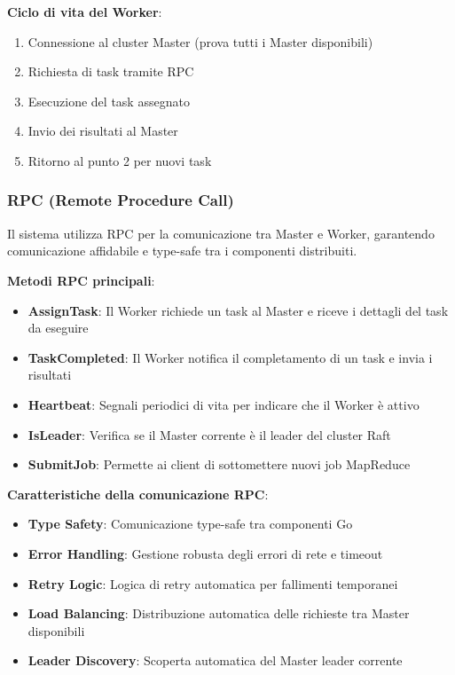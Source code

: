 \documentclass[12pt,a4paper]{article}
\begin{document}
\textbf{Ciclo di vita del Worker}:
\begin{enumerate}
\item Connessione al cluster Master (prova tutti i Master disponibili)
\item Richiesta di task tramite RPC
\item Esecuzione del task assegnato
\item Invio dei risultati al Master
\item Ritorno al punto 2 per nuovi task
\end{enumerate}

\subsubsection{RPC (Remote Procedure Call)}

Il sistema utilizza RPC per la comunicazione tra Master e Worker, garantendo comunicazione affidabile e type-safe tra i componenti distribuiti.

\textbf{Metodi RPC principali}:
\begin{itemize}
\item \textbf{AssignTask}: Il Worker richiede un task al Master e riceve i dettagli del task da eseguire
\item \textbf{TaskCompleted}: Il Worker notifica il completamento di un task e invia i risultati
\item \textbf{Heartbeat}: Segnali periodici di vita per indicare che il Worker è attivo
\item \textbf{IsLeader}: Verifica se il Master corrente è il leader del cluster Raft
\item \textbf{SubmitJob}: Permette ai client di sottomettere nuovi job MapReduce
\end{itemize}

\textbf{Caratteristiche della comunicazione RPC}:
\begin{itemize}
\item \textbf{Type Safety}: Comunicazione type-safe tra componenti Go
\item \textbf{Error Handling}: Gestione robusta degli errori di rete e timeout
\item \textbf{Retry Logic}: Logica di retry automatica per fallimenti temporanei
\item \textbf{Load Balancing}: Distribuzione automatica delle richieste tra Master disponibili
\item \textbf{Leader Discovery}: Scoperta automatica del Master leader corrente
\end{itemize}
\end{document}
